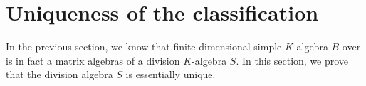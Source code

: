 \section{Uniqueness of the classification}\label{sec:wed-artin-unique}
In the previous section, we know that finite dimensional simple $K$-algebra $B$ over is in fact a matrix algebras of a division $K$-algebra $S$. In this section, we prove that the division algebra $S$ is essentially unique.

